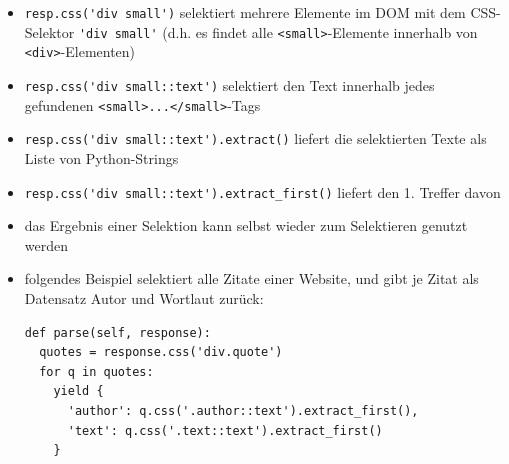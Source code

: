 \documentclass{beamer}
\begin{document}
\begin{frame}
	\framebreak
	
	\begin{itemize}
		\item \lstinline|resp.css('div small')| selektiert mehrere Elemente im DOM
		mit dem CSS-Selektor \lstinline|'div small'| (d.h. es findet alle \lstinline|<small>|-Elemente innerhalb von \lstinline|<div>|-Elementen)
		\item \lstinline|resp.css('div small::text')| selektiert den Text innerhalb jedes gefundenen \lstinline|<small>...</small>|-Tags
		\item \lstinline|resp.css('div small::text').extract()| liefert die selektierten Texte als Liste von Python-Strings
		\item \lstinline|resp.css('div small::text').extract_first()| liefert den 1. Treffer davon
	\end{itemize}
	
	\framebreak
	
	\begin{itemize}
		\item das Ergebnis einer Selektion kann selbst wieder zum Selektieren genutzt werden
		\item folgendes Beispiel selektiert alle Zitate einer Website, und gibt je Zitat als Datensatz Autor und Wortlaut zurück:
	\begin{lstlisting}
def parse(self, response):
  quotes = response.css('div.quote')
  for q in quotes:
    yield {
      'author': q.css('.author::text').extract_first(),
      'text': q.css('.text::text').extract_first()
    }
	\end{lstlisting}
	\end{itemize}
\end{frame}
\end{document}
